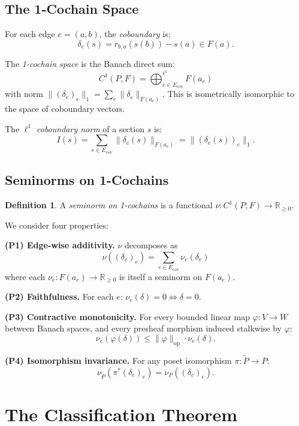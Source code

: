 \documentclass[11pt,a4paper]{amsart}
\theoremstyle{plain}
\theoremstyle{definition}
\newtheorem{definition}[theorem]{Definition}
\DeclareMathOperator{\opnorm}{op}
\begin{document}
\subsection{The 1-Cochain Space}

For each edge $e = (a, b)$, the \emph{coboundary} is:
\[
\delta_e(s) = r_{b,a}(s(b)) - s(a) \in F(a).
\]

The \emph{1-cochain space} is the Banach direct sum:
\[
C^1(P, F) = \bigoplus_{e \in E_{\mathrm{cov}}}^{\ell^1} F(a_e)
\]
with norm $\|(\delta_e)_e\|_1 = \sum_e \|\delta_e\|_{F(a_e)}$. This is isometrically isomorphic to the space of coboundary vectors.

The \emph{$\ell^1$ coboundary norm} of a section $s$ is:
\[
I(s) = \sum_{e \in E_{\mathrm{cov}}} \|\delta_e(s)\|_{F(a_e)} = \|(\delta_e(s))_e\|_1.
\]

\subsection{Seminorms on 1-Cochains}

\begin{definition}\label{def:seminorm}
A \emph{seminorm on 1-cochains} is a functional $\nu: C^1(P, F) \to \mathbb{R}_{\geq 0}$.
\end{definition}

We consider four properties:

\medskip
\noindent\textbf{(P1) Edge-wise additivity.} $\nu$ decomposes as
\[
\nu((\delta_e)_e) = \sum_{e \in E_{\mathrm{cov}}} \nu_e(\delta_e)
\]
where each $\nu_e: F(a_e) \to \mathbb{R}_{\geq 0}$ is itself a seminorm on $F(a_e)$.

\medskip
\noindent\textbf{(P2) Faithfulness.} For each $e$: $\nu_e(\delta) = 0 \iff \delta = 0$.

\medskip
\noindent\textbf{(P3) Contractive monotonicity.} For every bounded linear map $\varphi: V \to W$ between Banach spaces, and every presheaf morphism induced stalkwise by $\varphi$:
\[
\nu_e(\varphi(\delta)) \leq \|\varphi\|_{\opnorm} \cdot \nu_e(\delta).
\]

\medskip
\noindent\textbf{(P4) Isomorphism invariance.} For any poset isomorphism $\pi: \tilde{P} \to P$:
\[
\nu_{\tilde{P}}(\pi^*(\delta_e)_e) = \nu_P((\delta_e)_e).
\]

\section{The Classification Theorem}
\end{document}
